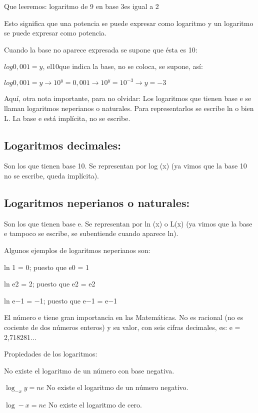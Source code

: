 \documentclass{article}
\begin{document}
Que leeremos: logaritmo de 9 en base 3es igual a 2

Esto significa que una potencia se puede expresar como logaritmo y un logaritmo se puede expresar como potencia.

Cuando la base no aparece expresada se supone que \'esta es 10:

 $log0,001=y$, el10que indica la base, no se coloca, se supone, as\'i:

 $log0,001=y\rightarrow 10^{y}=0,001\rightarrow 10^{y}=10^{-3}\rightarrow y=-3$

Aqu\'i, otra nota importante, para no olvidar: Los logaritmos que tienen base e se llaman logaritmos neperianos o naturales. Para representarlos se escribe ln o bien L. La base e est\'a impl\'icita, no se escribe.

\subsection[Logaritmos decimales:]{Logaritmos decimales:}
Son los que tienen base 10. Se representan por log (x) (ya vimos que la base 10 no se escribe, queda impl\'icita).

\subsection[Logaritmos neperianos o naturales:]{Logaritmos neperianos o naturales:}
Son los que tienen base e. Se representan por ln (x) o L(x) (ya vimos que la base e tampoco se escribe, se subentiende cuando aparece ln).

Algunos ejemplos de logaritmos neperianos son:

ln 1 = 0; puesto que e0 = 1

ln e2 = 2; puesto que e2 = e2

ln e$-$1 = $-$1; puesto que e$-$1 = e$-$1

El n\'umero e tiene gran importancia en las Matem\'aticas. No es racional (no es cociente de dos n\'umeros enteros) y su valor, con seis cifras decimales, es: e = 2,718281...

Propiedades de los logaritmos:

No existe el logaritmo de un n\'umero con base negativa.

 $\log _{-x}y=\mathit{ne}$ \newline
No existe el logaritmo de un n\'umero negativo.

 $\log -x=\mathit{ne}$ \newline
No existe el logaritmo de cero.
\end{document}
